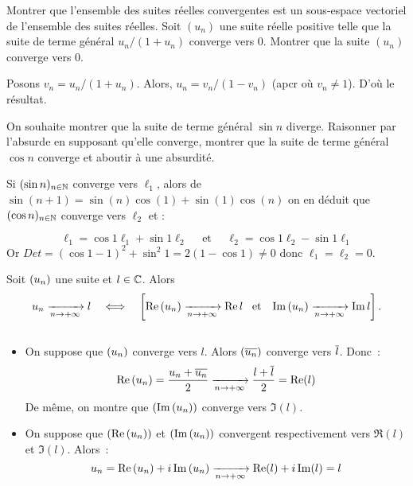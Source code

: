 \documentclass{magnolia}
\begin{document}
\begin{exos}
\exo Montrer que l'ensemble des suites réelles convergentes est un sous-espace
  vectoriel de l'ensemble des suites réelles.
\exo Soit $(u_n)$ une suite réelle positive telle que la suite de
  terme général $u_n/(1+u_n)$ converge vers 0. Montrer que la suite $(u_n)$
  converge vers 0.
  
  \begin{sol}
  Posons $v_n=u_n/(1+u_n)$. Alors, $u_n=v_n/(1-v_n)$ (apcr où $v_n\neq 1$). D'où le résultat.
  \end{sol}
\exo On souhaite montrer que la suite de terme général $\sin n$ diverge.
  Raisonner par l'absurde en supposant qu'elle converge, montrer que
  la suite de terme général $\cos n$ converge et aboutir à une absurdité.
  \begin{sol}
  Si $(\sin n)_{n\in\mathbb{N}}$ converge vers $\ell_1$, alors de $\sin(n+1)=\sin(n)\cos(1)+\sin(1)\cos(n)$ on en déduit que $(\cos n)_{n\in\mathbb{N}}$ converge vers $\ell_2$ et :
  
    \[\ell_1 = \cos 1 \ell_1 + \sin 1 \ell_2 \quad \text{ et } \quad  \ell_2 = \cos 1 \ell_2 - \sin 1 \ell_1\]
Or $Det = (\cos 1-1)^2 + \sin^2 1 = 2(1-\cos 1)\neq 0$ donc  $\ell_1=\ell_2=0$.
    \end{sol}
\end{exos}

\begin{proposition}[utile=-3]
Soit $\left(u_n\right)$ une suite et $l\in\mathbb{C}$. Alors
\[u_n \xrightarrow[n\rightarrow +\infty]{} l \quad\Longleftrightarrow\quad
  \left[\mathop{\rm Re}\left(u_n\right)\xrightarrow[n\rightarrow +\infty]{}\mathop{\rm Re}l \quad\!\text{et}\quad\!
       \mathop{\rm Im}\left(u_n\right)\xrightarrow[n\rightarrow +\infty]{}\mathop{\rm Im}l\right].\] 
\end{proposition}

\begin{preuve}
$\quad$
\begin{itemize}
\item On suppose que $\left(u_n\right)$ converge vers $l$. Alors $\left(\overline{u_n}\right)$ 
  converge vers $\overline{l}$. Donc~:
  \[\mathop{\rm Re}\left(u_n\right)=\frac{u_n+\overline{u_n}}{2}\xrightarrow[n\rightarrow +\infty]{}
    \frac{l+\overline{l}}{2}=\mathop{\rm Re}(l)\]
  De même, on montre que $\left(\mathop{\rm Im}\left(u_n\right)\right)$ converge vers $\Im(l)$.
\item On suppose que $\left(\mathop{\rm Re}\left(u_n\right)\right)$ et $\left(\mathop{\rm Im}\left(u_n\right)\right)$ convergent
  respectivement vers $\Re(l)$ et $\Im(l)$. Alors~:
  \[u_n=\mathop{\rm Re}\left(u_n\right)+i\mathop{\rm Im}\left(u_n\right)\xrightarrow[n\rightarrow +\infty]{} \mathop{\rm Re}(l)+i\mathop{\rm Im}(l)=l\]
\end{itemize}
\end{preuve}
\end{document}
